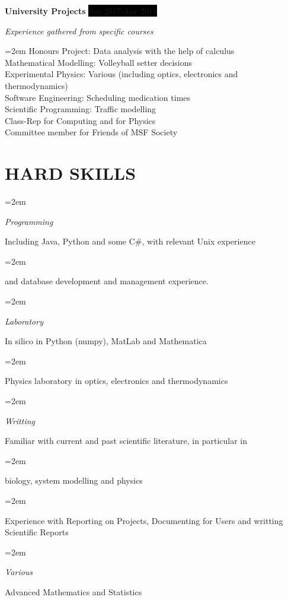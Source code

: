 \documentclass[paper=a4,fontsize=11pt]{scrartcl} %
\newlength{\spacebox}
\newcommand{\sepspace}{\vspace*{1em}}		%
\newcommand{\NewPart}[1]{\section*{\uppercase{#1}}}
\newcommand{\PersonalEntry}[2]{
		\noindent\hangindent=2em\hangafter=0 %
		\parbox{\spacebox}{        %
		\textit{#1}}		       %
		\hspace{1.5em} #2 \par}    %
\newcommand{\SkillsEntry}[2]{      %
		\noindent\hangindent=2em\hangafter=0 %
		\parbox{\spacebox}{        %
		\textit{#1}}			   %
		\hspace{1.5em} \parbox{6\spacebox}{#2} \par}    %
\newcommand{\EducationEntry}[4]{
		\noindent \textbf{#1} \hfill      %
		\colorbox{Black}{%
			\parbox{6em}{%
			\hfill\color{White}#2}} \par  %
		\noindent \textit{#3} \par        %
		\noindent\hangindent=2em\hangafter=0 \small #4 %
		\normalsize \par}
\newcommand{\WorkEntry}[4]{				  %
		\noindent \textbf{#1} \hfill      %
		\colorbox{Black}{\color{White}#2} \par  %
		\noindent \textit{#3} \par              %
		\noindent\hangindent=2em\hangafter=0 \small #4 %
		\normalsize \par}
\begin{document}


\WorkEntry{University Projects}{Sep 2017-Apr 2019}{Experience gathered from specific courses}{
  Honours Project: Data analysis with the help of calculus \\ Mathematical Modelling: Volleyball setter decisions \\Experimental Physics: Various (including optics, electronics and thermodynamics) \\ Software Engineering: Scheduling medication times \\  Scientific Programming: Traffic modelling \\ Class-Rep for Computing and for Physics \\ Committee member for Friends of MSF Society}

\clearpage
\NewPart{Hard Skills}{}


\SkillsEntry{Programming}{Including Java, Python and some C\#, with relevant Unix experience}
\SkillsEntry{}{and database development and management experience.}
\sepspace

\SkillsEntry{Laboratory}{In silico in Python (numpy), MatLab and Mathematica}
\SkillsEntry{}{Physics laboratory in optics, electronics and thermodynamics}
\sepspace

\SkillsEntry{Writting}{Familiar with current and past scientific literature, in particular in }
\SkillsEntry{}{biology, system modelling and physics}
\vspace{5pt}
\SkillsEntry{}{Experience with Reporting on Projects, Documenting for Users and writting Scientific Reports}
\sepspace

\SkillsEntry{Various}{Advanced Mathematics and Statistics}
\sepspace
\end{document}
